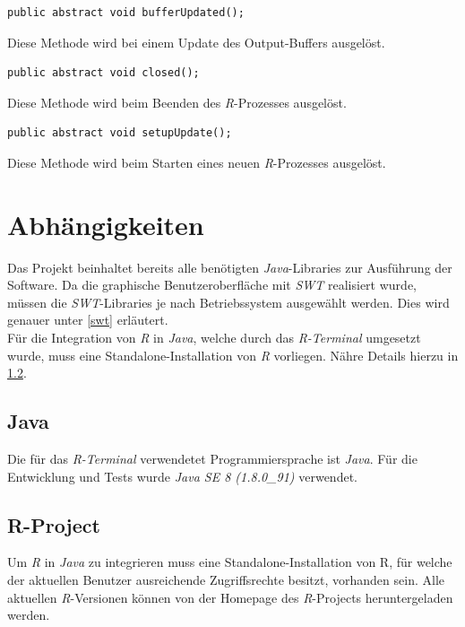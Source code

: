 \documentclass[a4paper, 12pt]{report} %
\begin{document}
\lstset{language=Java}
\begin{lstlisting}[frame=single]
public abstract void bufferUpdated();
\end{lstlisting}
Diese Methode wird bei einem Update des Output-Buffers ausgelöst.\\

\lstset{language=Java}
\begin{lstlisting}[frame=single]
public abstract void closed();
\end{lstlisting}
Diese Methode wird beim Beenden des \textit{R}-Prozesses ausgelöst.\\

\lstset{language=Java}
\begin{lstlisting}[frame=single]
public abstract void setupUpdate();
\end{lstlisting}
Diese Methode wird beim Starten eines neuen \textit{R}-Prozesses ausgelöst.


\section{Abhängigkeiten} \label{Abhängigkeiten}

Das Projekt beinhaltet bereits alle benötigten \textit{Java}-Libraries zur Ausführung der Software. 
Da die graphische Benutzeroberfläche mit \textit{SWT} realisiert wurde, müssen die \textit{SWT}-Libraries je nach Betriebssystem ausgewählt werden. Dies wird genauer unter \ref{swt} erläutert.\\

Für die Integration von \textit{R} in \textit{Java}, welche durch das \textit{R-Terminal} umgesetzt wurde, muss eine Standalone-Installation von \textit{R} vorliegen. Nähre Details hierzu in \ref{r}.
 
\subsection{Java}

Die für das \textit{R-Terminal} verwendetet Programmiersprache ist \textit{Java}. Für die Entwicklung und Tests wurde \textit{Java SE 8 (1.8.0\_91)} verwendet. \cite{java}
 
\subsection{R-Project} \label{r}

Um \textit{R} in \textit{Java} zu integrieren muss eine Standalone-Installation von R, für welche der aktuellen Benutzer ausreichende Zugriffsrechte besitzt, vorhanden sein. 
Alle aktuellen \textit{R}-Versionen können von der Homepage des \textit{R}-Projects \cite{rproject} heruntergeladen werden. 
\end{document}
